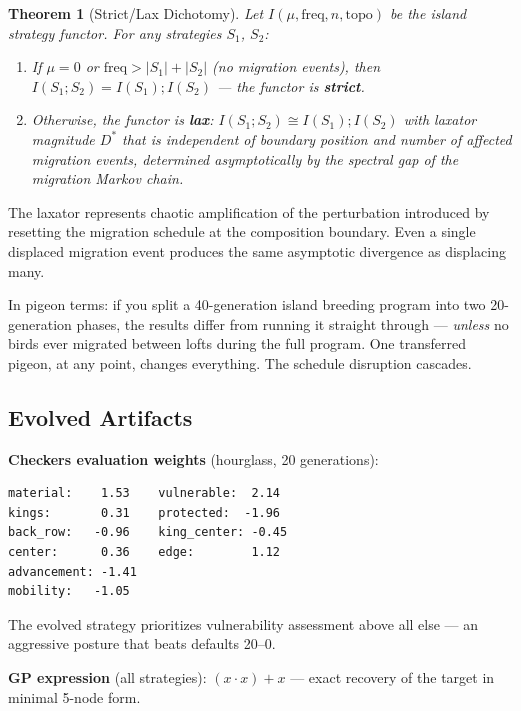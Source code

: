 \documentclass[10pt]{article}
\newtheorem{theorem}{Theorem}[section]
\begin{document}
\begin{theorem}[Strict/Lax Dichotomy]
\label{thm:dichotomy}
Let $I(\mu, \mathrm{freq}, n, \mathrm{topo})$ be the island strategy functor. For any strategies $S_1$, $S_2$:

\begin{enumerate}
  \item If $\mu = 0$ or $\mathrm{freq} > |S_1| + |S_2|$ (no migration events), then $I(S_1 ; S_2) = I(S_1) ; I(S_2)$ --- the functor is \textbf{strict}.
  \item Otherwise, the functor is \textbf{lax}: $I(S_1 ; S_2) \cong I(S_1) ; I(S_2)$ with laxator magnitude $D^*$ that is independent of boundary position and number of affected migration events, determined asymptotically by the spectral gap of the migration Markov chain.
\end{enumerate}
\end{theorem}

The laxator represents chaotic amplification of the perturbation introduced by resetting the migration schedule at the composition boundary. Even a single displaced migration event produces the same asymptotic divergence as displacing many.

In pigeon terms: if you split a 40-generation island breeding program into two 20-generation phases, the results differ from running it straight through --- \emph{unless} no birds ever migrated between lofts during the full program. One transferred pigeon, at any point, changes everything. The schedule disruption cascades.


\subsection{Evolved Artifacts}

\textbf{Checkers evaluation weights} (hourglass, 20 generations):
\begin{lstlisting}[style=plainstyle]
material:    1.53    vulnerable:  2.14
kings:       0.31    protected:  -1.96
back_row:   -0.96    king_center: -0.45
center:      0.36    edge:        1.12
advancement: -1.41
mobility:   -1.05
\end{lstlisting}

The evolved strategy prioritizes vulnerability assessment above all else --- an aggressive posture that beats defaults 20--0.

\textbf{GP expression} (all strategies): $(x \cdot x) + x$ --- exact recovery of the target in minimal 5-node form.
\end{document}
